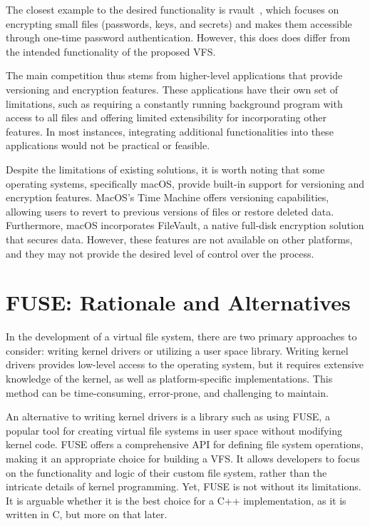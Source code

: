 The closest example to the desired functionality is rvault~\cite{rvault}, which focuses on encrypting small files (passwords, keys, and secrets) and makes them accessible through one-time password authentication.
However, this does does differ from the intended functionality of the proposed VFS\@.

The main competition thus stems from higher-level applications that provide versioning and encryption features.
These applications have their own set of limitations, such as requiring a constantly running background program with access to all files and offering limited extensibility for incorporating other features.
In most instances, integrating additional functionalities into these applications would not be practical or feasible.

Despite the limitations of existing solutions, it is worth noting that some operating systems, specifically macOS, provide built-in support for versioning and encryption features.
MacOS's Time Machine offers versioning capabilities, allowing users to revert to previous versions of files or restore deleted data.
Furthermore, macOS incorporates FileVault, a native full-disk encryption solution that secures data.
However, these features are not available on other platforms, and they may not provide the desired level of control over the process.

\section{FUSE: Rationale and Alternatives}\label{sec:fuse-analysis}

In the development of a virtual file system, there are two primary approaches to consider: writing kernel drivers or utilizing a user space library.
Writing kernel drivers provides low-level access to the operating system, but it requires extensive knowledge of the kernel, as well as platform-specific implementations.
This method can be time-consuming, error-prone, and challenging to maintain.

An alternative to writing kernel drivers is a library such as using FUSE, a popular tool for creating virtual file systems in user space without modifying kernel code.
FUSE offers a comprehensive API for defining file system operations, making it an appropriate choice for building a VFS.
It allows developers to focus on the functionality and logic of their custom file system, rather than the intricate details of kernel programming.
Yet, FUSE is not without its limitations.
It is arguable whether it is the best choice for a C++ implementation, as it is written in C, but more on that later.

